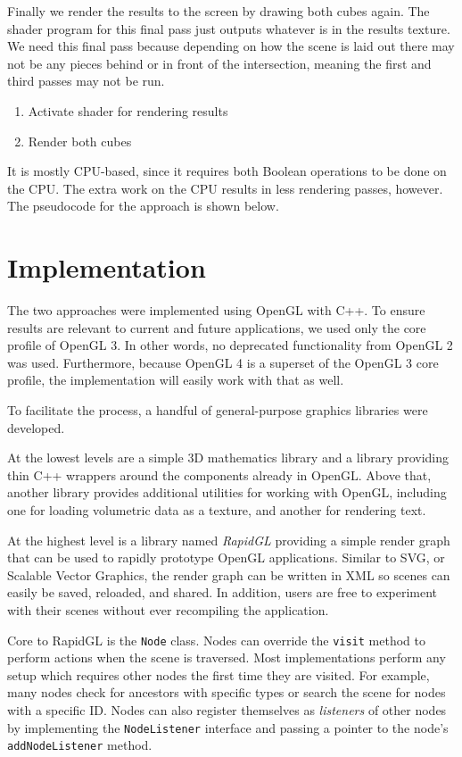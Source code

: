 \documentclass{article}
\begin{document}
Finally we render the results to the screen by drawing both cubes again.  The
shader program for this final pass just outputs whatever is in the results
texture.  We need this final pass because depending on how the scene is laid out
there may not be any pieces behind or in front of the intersection, meaning the
first and third passes may not be run.

\begin{enumerate}
  \item Activate shader for rendering results
  \item Render both cubes
\end{enumerate}

It is mostly CPU-based, since it requires both Boolean operations to be done on
the CPU.  The extra work on the CPU results in less rendering passes, however.
The pseudocode for the approach is shown below.

\section{Implementation}

The two approaches were implemented using OpenGL with C++.  To ensure results
are relevant to current and future applications, we used only the core profile
of OpenGL 3.  In other words, no deprecated functionality from OpenGL 2 was
used.  Furthermore, because OpenGL 4 is a superset of the OpenGL 3 core profile,
the implementation will easily work with that as well.

To facilitate the process, a handful of general-purpose graphics libraries were
developed.

At the lowest levels are a simple 3D mathematics library and a library providing
thin C++ wrappers around the components already in OpenGL.  Above that, another
library provides additional utilities for working with OpenGL, including one for
loading volumetric data as a texture, and another for rendering text.

At the highest level is a library named {\em RapidGL} providing a simple render
graph that can be used to rapidly prototype OpenGL applications.  Similar to
SVG, or Scalable Vector Graphics, the render graph can be written in XML so
scenes can easily be saved, reloaded, and shared.  In addition, users are free
to experiment with their scenes without ever recompiling the application.

Core to RapidGL is the {\tt Node} class.  Nodes can override the {\tt visit}
method to perform actions when the scene is traversed.  Most implementations
perform any setup which requires other nodes the first time they are visited.
For example, many nodes check for ancestors with specific types or search the
scene for nodes with a specific ID.  Nodes can also register themselves as {\em
listeners} of other nodes by implementing the {\tt NodeListener} interface and
passing a pointer to the node's {\tt addNodeListener} method.
\end{document}
